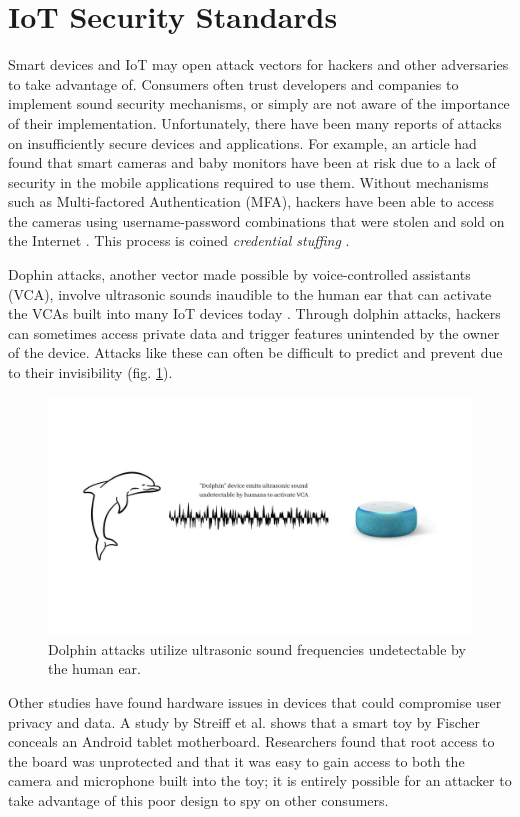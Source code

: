 \documentclass[12pt]{ucthesis}
\begin{document}
\section{IoT Security Standards}
Smart devices and IoT may open attack vectors for hackers and other adversaries to take advantage of. Consumers often trust developers and companies to implement sound security mechanisms, or simply are not aware of the importance of their implementation. Unfortunately, there have been many reports of attacks on insufficiently secure devices and applications. For example, an article had found that smart cameras and baby monitors have been at risk due to a lack of security in the mobile applications required to use them. Without mechanisms such as Multi-factored Authentication (MFA), hackers have been able to access the cameras using username-password combinations that were stolen and sold on the Internet \cite{wp:camera}. This process is coined \textit{credential stuffing} \cite{stuffing}.

Dophin attacks, another vector made possible by voice-controlled assistants (VCA), involve ultrasonic sounds inaudible to the human ear that can activate the VCAs built into many IoT devices today \cite{dolphin}. Through dolphin attacks, hackers can sometimes access private data and trigger features unintended by the owner of the device. Attacks like these can often be difficult to predict and prevent due to their invisibility (fig. \ref{fig:dolphin}).

\begin{figure}
    \centering
    \includegraphics[width=\textwidth]{dolphinattack.jpg}
    \caption{Dolphin attacks utilize ultrasonic sound frequencies undetectable by the human ear.}
    \label{fig:dolphin}
\end{figure}

Other studies have found hardware issues in devices that could compromise user privacy and data. A study by Streiff et al. \cite{streiff:overpowered} shows that a smart toy by Fischer conceals an Android tablet motherboard. Researchers found that root access to the board was unprotected and that it was easy to gain access to both the camera and microphone built into the toy; it is entirely possible for an attacker to take advantage of this poor design to spy on other consumers.
\end{document}
